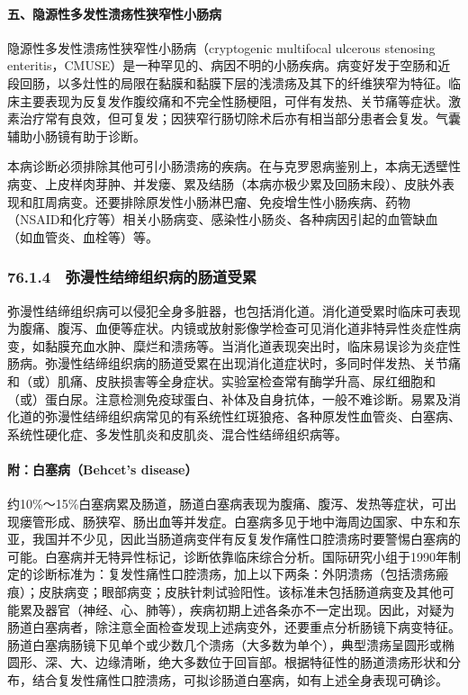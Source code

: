 \paragraph{五、隐源性多发性溃疡性狭窄性小肠病}

隐源性多发性溃疡性狭窄性小肠病（cryptogenic multifocal ulcerous
stenosing
enteritis，CMUSE）是一种罕见的、病因不明的小肠疾病。病变好发于空肠和近段回肠，以多灶性的局限在黏膜和黏膜下层的浅溃疡及其下的纤维狭窄为特征。临床主要表现为反复发作腹绞痛和不完全性肠梗阻，可伴有发热、关节痛等症状。激素治疗常有良效，但可复发；因狭窄行肠切除术后亦有相当部分患者会复发。气囊辅助小肠镜有助于诊断。

本病诊断必须排除其他可引小肠溃疡的疾病。在与克罗恩病鉴别上，本病无透壁性病变、上皮样肉芽肿、并发瘘、累及结肠（本病亦极少累及回肠末段）、皮肤外表现和肛周病变。还要排除原发性小肠淋巴瘤、免疫增生性小肠疾病、药物（NSAID和化疗等）相关小肠病变、感染性小肠炎、各种病因引起的血管缺血（如血管炎、血栓等）等。

\subsubsection{76.1.4　弥漫性结缔组织病的肠道受累}

弥漫性结缔组织病可以侵犯全身多脏器，也包括消化道。消化道受累时临床可表现为腹痛、腹泻、血便等症状。内镜或放射影像学检查可见消化道非特异性炎症性病变，如黏膜充血水肿、糜烂和溃疡等。当消化道表现突出时，临床易误诊为炎症性肠病。弥漫性结缔组织病的肠道受累在出现消化道症状时，多同时伴发热、关节痛和（或）肌痛、皮肤损害等全身症状。实验室检查常有酶学升高、尿红细胞和（或）蛋白尿。注意检测免疫球蛋白、补体及自身抗体，一般不难诊断。易累及消化道的弥漫性结缔组织病常见的有系统性红斑狼疮、各种原发性血管炎、白塞病、系统性硬化症、多发性肌炎和皮肌炎、混合性结缔组织病等。

\paragraph{附：白塞病（Behcet's disease）}

约10\%～15\%白塞病累及肠道，肠道白塞病表现为腹痛、腹泻、发热等症状，可出现瘘管形成、肠狭窄、肠出血等并发症。白塞病多见于地中海周边国家、中东和东亚，我国并不少见，因此当肠道病变伴有反复发作痛性口腔溃疡时要警惕白塞病的可能。白塞病并无特异性标记，诊断依靠临床综合分析。国际研究小组于1990年制定的诊断标准为：复发性痛性口腔溃疡，加上以下两条：外阴溃疡（包括溃疡瘢痕）；皮肤病变；眼部病变；皮肤针刺试验阳性。该标准未包括肠道病变及其他可能累及器官（神经、心、肺等），疾病初期上述各条亦不一定出现。因此，对疑为肠道白塞病者，除注意全面检查发现上述病变外，还要重点分析肠镜下病变特征。肠道白塞病肠镜下见单个或少数几个溃疡（大多数为单个），典型溃疡呈圆形或椭圆形、深、大、边缘清晰，绝大多数位于回盲部。根据特征性的肠道溃疡形状和分布，结合复发性痛性口腔溃疡，可拟诊肠道白塞病，如有上述全身表现可确诊。

